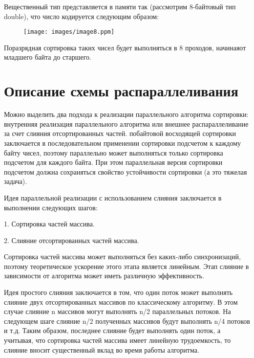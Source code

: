 \documentclass{report}
\begin{document}
Вещественный тип представляется в памяти так (рассмотрим 8-байтовый тип double), что число кодируется следующим образом: 

\begin{figure}[htp]
    \centering
    \texttt{[image: images/image8.ppm]}
    \label{fig:galaxy}
\end{figure}
Поразрядная сортировка таких чисел будет выполняться в 8 проходов, начинаяот младшего байта до старшего.


\newpage

\section*{Описание схемы распараллеливания}

\par Можно выделить два подхода к реализации параллельного алгоритма сортировки: внутренняя реализация параллельного алгоритма или внешнее распараллеливание за счет слияния отсортированных частей.
 побайтовой восходящей сортировки заключается в последовательном применении сортировки подсчетом к каждому байту чисел, поэтому параллельно может выполняться только сортировка подсчетом для каждого байта. При этом параллельная версия сортировки подсчетом должна сохраняться свойство устойчивости сортировки (а это тяжелая задача).
\par Идея параллельной реализации с использованием слияния заключается в выполнении следующих шагов:

1. Сортировка частей массива.
\par2. Слияние отсортированных частей массива.

\par Сортировка частей массива может выполняться без каких-либо синхронизаций, поэтому теоретическое ускорение этого этапа является линейным. Этап слияние в зависимости от алгоритма может иметь различную эффективность.

\par Идея простого слияния заключается в том, что один поток может выполнять слияние двух отсортированных массивов по классическому алгоритму. В этом случае слияние n массивов могут выполнять n/2 параллельных потоков. На следующем шаге слияние n/2 полученных массивов будут выполнять n/4 потоков и т.д. Таким образом, последнее слияние будет выполнять один поток, а учитывая, что сортировка частей массива имеет линейную трудоемкость, то слияние вносит существенный вклад во время работы алгоритма.
\end{document}
